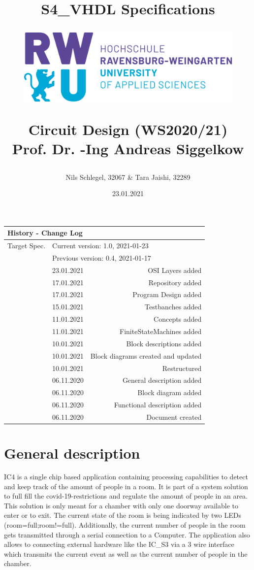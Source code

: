 \documentclass[12pt,a4 paper] {report}
\title{
	\textbf{S4\_VHDL Specifications} \\
	\begin{figure}[h]
		\centering
		\includegraphics[scale=0.4]{../png/rwu.png}
	\end{figure}
	Circuit Design (WS2020/21) \\
	Prof. Dr. -Ing Andreas Siggelkow \\
}
\author{Nils Schlegel, 32067 \& Tara Jaishi, 32289}
\date{23.01.2021}
\begin{document}
\maketitle

\newpage

\begin{center}
	\begin{tabular}{llr}
		\multicolumn{3}{l}{\textbf{History - Change Log}} \\
		\hline
		Target Spec. & \multicolumn{2}{l}{Current version: 1.0, 2021-01-23} \\
		& \multicolumn{2}{l}{Previous version: 0.4, 2021-01-17} \\
		\hline
		&	23.01.2021 & OSI Layers added \\
		&	17.01.2021 & Repository added \\
		&	17.01.2021 & Program Design added \\
		&	15.01.2021 & Testbanches added \\
		&	11.01.2021 & Concepts added \\
		&	11.01.2021 & FiniteStateMachines added \\
		&	10.01.2021 & Block descriptions added \\
		&	10.01.2021 & Block diagrams created and updated \\
		&	10.01.2021 & Restructured \\
		&	06.11.2020 & General description added \\
		&	06.11.2020 & Block diagram added \\
		&	06.11.2020 & Functional description added \\
		&	06.11.2020 & Document created
	\end{tabular}
\end{center}

\newpage

\tableofcontents

\newpage

\chapter{General description}
IC4 is a single chip based application containing processing capabilities to detect and keep track of the amount of people in a room. 
It is part of a system solution to full fill the covid-19-restrictions and regulate the amount of people in an area. This solution is only 
meant for a chamber with only one doorway available to enter or to exit.\newline
The current state of the room is being indicated by two LEDs (room=full;room!=full). Additionally, the current number of people in the room 
gets transmitted through a serial connection to a Computer. The application also allows to connecting external hardware like the IC\_S3 via a 
3 wire interface which transmits the current event as well as the current number of people in the chamber.
\end{document}
